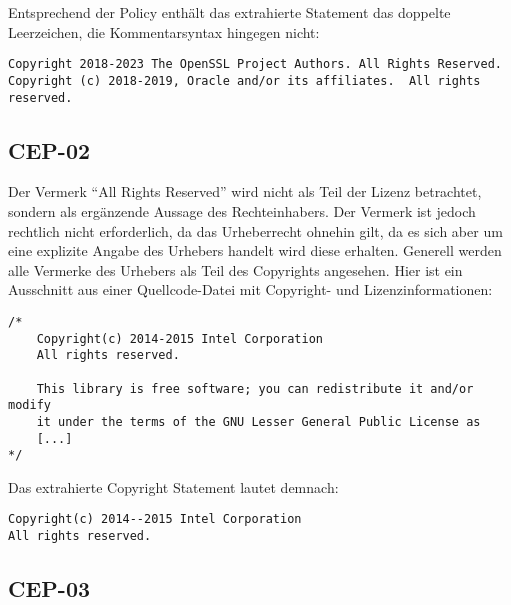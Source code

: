 Entsprechend der Policy enthält das extrahierte Statement das doppelte Leerzeichen, die Kommentarsyntax hingegen nicht:
\begin{lstlisting}[numbers=none, keepspaces=true]
Copyright 2018-2023 The OpenSSL Project Authors. All Rights Reserved.
Copyright (c) 2018-2019, Oracle and/or its affiliates.  All rights reserved.
\end{lstlisting}



\subsection{CEP-02}\label{subsec:cep-02}

Der Vermerk \enquote{All Rights Reserved} wird nicht als Teil der Lizenz betrachtet, sondern als ergänzende Aussage des Rechteinhabers.
Der Vermerk ist jedoch rechtlich nicht erforderlich, da das Urheberrecht ohnehin gilt, da es sich aber um eine explizite Angabe des Urhebers handelt wird diese erhalten.
Generell werden alle Vermerke des Urhebers als Teil des Copyrights angesehen.
Hier ist ein Ausschnitt aus einer Quellcode-Datei mit Copyright- und Lizenzinformationen:

\begin{lstlisting}[numbers=none, keepspaces=true]
/*
    Copyright(c) 2014-2015 Intel Corporation
    All rights reserved.

    This library is free software; you can redistribute it and/or modify
    it under the terms of the GNU Lesser General Public License as
    [...]
*/
\end{lstlisting}

Das extrahierte Copyright Statement lautet demnach:

\begin{lstlisting}[numbers=none, keepspaces=true]
Copyright(c) 2014--2015 Intel Corporation
All rights reserved.
\end{lstlisting}


\subsection{CEP-03}\label{subsec:cep-03}

